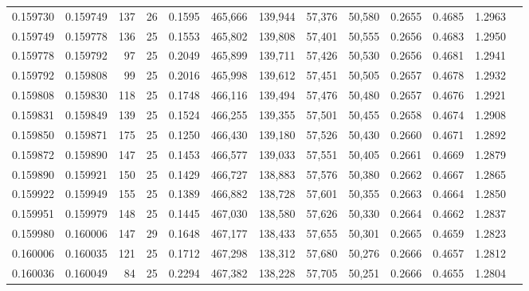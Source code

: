 \begin{tabular}{rrrrrrrrrrrrr}
0.159730 & 0.159749 & 137 &  26 &                                     0.1595 & 465,666 & 139,944 &  57,376 &  50,580 & 0.2655 & 0.4685 & 1.2963 \\
0.159749 & 0.159778 & 136 &  25 &                                     0.1553 & 465,802 & 139,808 &  57,401 &  50,555 & 0.2656 & 0.4683 & 1.2950 \\
0.159778 & 0.159792 &  97 &  25 &                                     0.2049 & 465,899 & 139,711 &  57,426 &  50,530 & 0.2656 & 0.4681 & 1.2941 \\
0.159792 & 0.159808 &  99 &  25 &                                     0.2016 & 465,998 & 139,612 &  57,451 &  50,505 & 0.2657 & 0.4678 & 1.2932 \\
0.159808 & 0.159830 & 118 &  25 &                                     0.1748 & 466,116 & 139,494 &  57,476 &  50,480 & 0.2657 & 0.4676 & 1.2921 \\
0.159831 & 0.159849 & 139 &  25 &                                     0.1524 & 466,255 & 139,355 &  57,501 &  50,455 & 0.2658 & 0.4674 & 1.2908 \\
0.159850 & 0.159871 & 175 &  25 &                                     0.1250 & 466,430 & 139,180 &  57,526 &  50,430 & 0.2660 & 0.4671 & 1.2892 \\
0.159872 & 0.159890 & 147 &  25 &                                     0.1453 & 466,577 & 139,033 &  57,551 &  50,405 & 0.2661 & 0.4669 & 1.2879 \\
0.159890 & 0.159921 & 150 &  25 &                                     0.1429 & 466,727 & 138,883 &  57,576 &  50,380 & 0.2662 & 0.4667 & 1.2865 \\
0.159922 & 0.159949 & 155 &  25 &                                     0.1389 & 466,882 & 138,728 &  57,601 &  50,355 & 0.2663 & 0.4664 & 1.2850 \\
0.159951 & 0.159979 & 148 &  25 &                                     0.1445 & 467,030 & 138,580 &  57,626 &  50,330 & 0.2664 & 0.4662 & 1.2837 \\
0.159980 & 0.160006 & 147 &  29 &                                     0.1648 & 467,177 & 138,433 &  57,655 &  50,301 & 0.2665 & 0.4659 & 1.2823 \\
0.160006 & 0.160035 & 121 &  25 &                                     0.1712 & 467,298 & 138,312 &  57,680 &  50,276 & 0.2666 & 0.4657 & 1.2812 \\
0.160036 & 0.160049 &  84 &  25 &                                     0.2294 & 467,382 & 138,228 &  57,705 &  50,251 & 0.2666 & 0.4655 & 1.2804 \\

\end{tabular}

